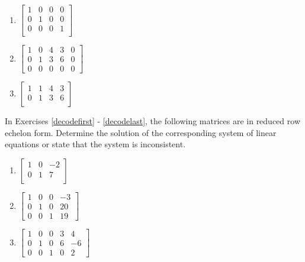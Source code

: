 \documentclass{ximera}
\begin{document}
\begin{multicols}{3}
\begin{enumerate}
\setcounter{enumi}{\value{HW}}


\item $\left[ \begin{array}{rrr|r} 
1 & 0 & 0 & 0 \\ 
0 & 1 & 0 & 0 \\ 
0 & 0 & 0 & 1  \\
\end{array} \right]$

\item $\left[ \begin{array}{rrrr|r} 
1 & 0 & 4 & 3 & 0 \\ 
0 & 1 & 3 & 6 & 0 \\ 
0 & 0 & 0 & 0 & 0 
\end{array} \right]$

\item $\left[ \begin{array}{rrr|r} 
1 & 1 & 4 & 3 \\ 
0 & 1 & 3 & 6 \\
\end{array} \right]$ \label{rreflast}

\setcounter{HW}{\value{enumi}}
\end{enumerate}
\end{multicols}

In Exercises \ref{decodefirst} - \ref{decodelast}, the following matrices are in reduced row echelon form.  Determine the solution of the corresponding system of linear equations or state that the system is inconsistent.  


\begin{multicols}{3}
\begin{enumerate}
\setcounter{enumi}{\value{HW}}

\item $\left[ \begin{array}{rr|r} 
1 & 0 & -2 \\ 
0 & 1 & 7  \\ 
\end{array} \right]$  \label{decodefirst}

\item $\left[ \begin{array}{rrr|r} 
1 & 0 & 0 & -3 \\ 
0 & 1 & 0 & 20 \\ 
0 & 0 & 1 & 19  
\end{array} \right]$

\item $\left[ \begin{array}{rrrr|r} 
1 & 0 & 0 & 3 & 4 \\ 
0 & 1 & 0 & 6 & -6 \\ 
0 & 0 & 1 & 0 & 2 
\end{array} \right]$

\setcounter{HW}{\value{enumi}}
\end{enumerate}
\end{multicols}
\end{document}
